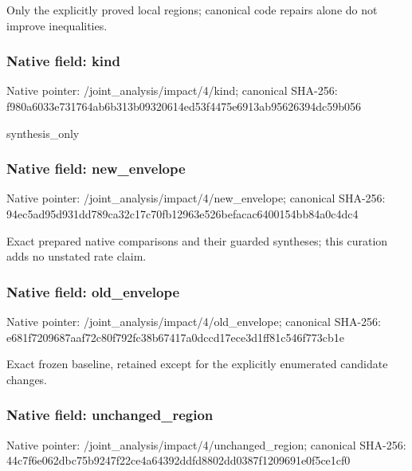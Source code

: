 \documentclass[10pt,a4paper]{article}
\begin{document}
\begingroup\raggedright\sloppy Only the explicitly proved local regions;\allowbreak{} canonical code repairs alone do not improve inequalities.\par\endgroup

\subsubsection{Native field: kind}
Native pointer: /joint\_\allowbreak{}analysis/impact/4/kind; canonical SHA-256: f980a6033e731764ab6b313b09320614ed53f4475e6913ab95626394dc59b056

\begingroup\raggedright\sloppy synthesis\_\allowbreak{}only\par\endgroup

\subsubsection{Native field: new\_\allowbreak{}envelope}
Native pointer: /joint\_\allowbreak{}analysis/impact/4/new\_\allowbreak{}envelope; canonical SHA-256: 94ec5ad95d931dd789ca32c17c70fb12963e526befacac6400154bb84a0c4dc4

\begingroup\raggedright\sloppy Exact prepared native comparisons and their guarded syntheses;\allowbreak{} this curation adds no unstated rate claim.\par\endgroup

\subsubsection{Native field: old\_\allowbreak{}envelope}
Native pointer: /joint\_\allowbreak{}analysis/impact/4/old\_\allowbreak{}envelope; canonical SHA-256: e681f7209687aaf72c80f792fc38b67417a0dccd17ece3d1ff81c546f773cb1e

\begingroup\raggedright\sloppy Exact frozen baseline,\allowbreak{} retained except for the explicitly enumerated candidate changes.\par\endgroup

\subsubsection{Native field: unchanged\_\allowbreak{}region}
Native pointer: /joint\_\allowbreak{}analysis/impact/4/unchanged\_\allowbreak{}region; canonical SHA-256: 44c7f6e062dbc75b9247f22ce4a64392ddfd8802dd0387f1209691e0f5ce1cf0
\end{document}
